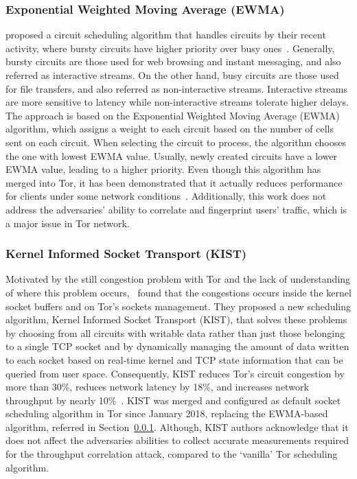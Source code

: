 \subsubsection{Exponential Weighted Moving Average (EWMA)}\label{subsubsec:exponentialwma}

\citeauthor{EWMA} proposed a circuit scheduling algorithm that handles circuits by their recent activity, where bursty circuits have higher priority over busy ones~\cite{EWMA}. Generally, bursty circuits are those used for web browsing and instant messaging, and also referred as interactive streams. On the other hand, busy circuits are those used for file transfers, and also referred as non-interactive streams. Interactive streams are more sensitive to latency while non-interactive streams tolerate higher delays.
The approach is based on the Exponential Weighted Moving Average (EWMA) algorithm, which assigns a weight to each circuit based on the number of cells sent on each circuit. When selecting the circuit to process, the algorithm chooses the one with lowest EWMA value. Usually, newly created circuits have a lower EWMA value, leading to a higher priority. 
Even though this algorithm has merged into Tor, it has been demonstrated that it actually reduces performance for clients under some network conditions~\cite{shadow-ndss2012}. Additionally, this work does not address the adversaries' ability to correlate and fingerprint users' traffic, which is a major issue in Tor network.

\subsubsection{Kernel Informed Socket Transport (KIST)}\label{subsubsec:kist}

Motivated by the still congestion problem with Tor and the lack of understanding of where this problem occurs,~\citeauthor{KIST} found that the congestions occurs inside the kernel socket buffers and on Tor's sockets management. They proposed a new scheduling algorithm, Kernel Informed Socket Transport (KIST), that solves these problems by choosing from all circuits with writable data rather than just those belonging to a single TCP socket and by dynamically managing the amount of data written to each socket based on real-time kernel and TCP state information that can be queried from user space. Consequently, KIST reduces Tor's circuit congestion by more than 30\%, reduces network latency by 18\%, and increases network throughput by nearly 10\%~\cite{KIST}. 
KIST was merged and configured as default socket scheduling algorithm in Tor since January 2018, replacing the EWMA-based algorithm, referred in Section~\ref{subsubsec:exponentialwma}. Although, KIST authors acknowledge that it does not affect the adversaries abilities to collect accurate measurements required for the throughput correlation attack, compared to the `vanilla' Tor scheduling algorithm.

